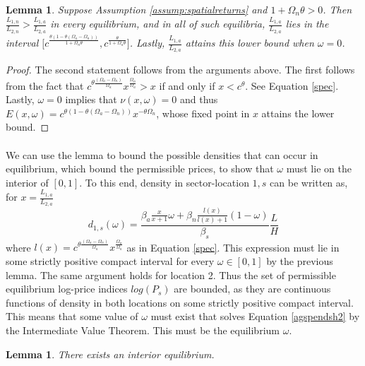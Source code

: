 \documentclass[]{article}
\theoremstyle{plain}
\newtheorem{lem}[thm]{Lemma}
\begin{document}
 \begin{lem}\label{append:lemspec}
 Suppose Assumption \ref{assump:spatialreturns} and $1 + \Omega_{n}\theta > 0$. Then $\frac{L_{1, n}}{L_{2, n}} > \frac{L_{1, a}}{L_{2, a}}$ in every equilibrium, and in all of such equilibria, $\frac{L_{1, a}}{L_{2, a}}$ lies in the interval $\big[c^{\frac{\theta(1-\theta(\Omega_{a}-\Omega_{n}))}{1 + \Omega_{n}\theta}}, c^{\frac{\theta}{1 + \Omega_{a}\theta}}\big]$. Lastly, $\frac{L_{1, a}}{L_{2, a}}$ attains this lower bound when $\omega = 0$. 	
 \end{lem}
 \begin{proof}
 	The second statement follows from the arguments above. The first follows from the fact that $c^{\theta\frac{(\Omega_{a} - \Omega_{n})}{\Omega_{a}}}x^{\frac{\Omega_{n}}{\Omega_{a}}} > x$ if and only if $x < c^{\theta}$. See Equation \eqref{spec}. Lastly, $\omega = 0$ implies that $\nu(x, \omega) = 0$ and thus $E(x, \omega) = c^{\theta(1-\theta(\Omega_{a} - \Omega_{n}))}x^{-\theta\Omega_{n}}$, whose fixed point in $x$ attains the lower bound.   
 \end{proof}
\paragraph*{}
We can use the lemma to bound the possible densities that can occur in equilibrium, which bound the permissible prices, to show that $\omega$ must lie on the interior of $[0, 1]$. To this end, density in sector-location $1,s$ can be written as, for $x = \frac{L_{1, a}}{L_{2, a}}$ 
\begin{equation}
d_{1, s}(\omega) = \frac{\beta_{a}\frac{x}{x + 1}\omega + \beta_{n}\frac{l(x)}{l(x) + 1}(1-\omega)}{\beta_{s}}\frac{L}{H}
\end{equation}  
where $l(x) = c^{\theta\frac{(\Omega_{a} - \Omega_{n})}{\Omega_{a}}}x^{\frac{\Omega_{n}}{\Omega_{a}}}$ as in Equation \eqref{spec}. This expression must lie in some strictly positive compact interval for every $\omega \in [0, 1]$ by the previous lemma. The same argument holds for location 2. Thus the set of permissible equilibrium log-price indices $log(P_{s})$ are bounded, as they are continuous functions of density in both locations on some strictly positive compact interval. This means that some value of $\omega$ must exist that solves Equation \eqref{agspendsh2} by the Intermediate Value Theorem. This must be the equilibrium $\omega$. 
\begin{lem}
	There exists an interior equilibrium. 
\end{lem}
\end{document}

